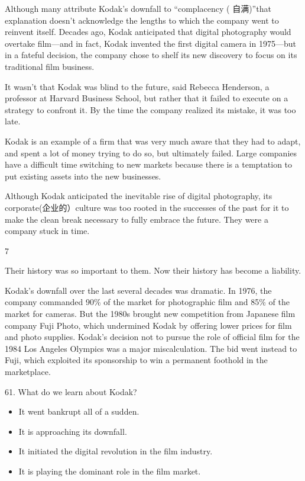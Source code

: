 \documentclass[UTF8,11pt]{ctexart}
\begin{document}
Although many attribute Kodak’s downfall to “complacency ( 自满)”that explanation doesn’t acknowledge the lengths to which the company went to reinvent itself. Decades ago, Kodak anticipated that digital photography would overtake film—and in fact, Kodak invented the first digital camera in 1975—but in a fateful decision, the company chose to shelf its new discovery to focus on its traditional film business.


It wasn’t that Kodak was blind to the future, said Rebecca Henderson, a professor at Harvard Business School, but rather that it failed to execute on a strategy to confront it. By the time the company realized its mistake, it was too late.


Kodak is an example of a firm that was very much aware that they had to adapt, and spent a lot of money trying to do so, but ultimately failed. Large companies have a difficult time switching to new markets because there is a temptation to put existing assets into the new businesses.


Although Kodak anticipated the inevitable rise of digital photography, its corporate(企业的）culture was too rooted in the successes of the past for it to make the clean break necessary to fully embrace the future. They were a company stuck in time.


7


Their history was so important to them. Now their history has become a liability.


Kodak’s downfall over the last several decades was dramatic. In 1976, the company commanded 90\% of the market for photographic film and 85\% of the market for cameras. But the 1980s brought new competition from Japanese film company Fuji Photo, which undermined Kodak by offering lower prices for film and photo supplies. Kodak’s decision not to pursue the role of official film for the 1984 Los Angeles Olympics was a major miscalculation. The bid went instead to Fuji, which exploited its sponsorship to win a permanent foothold in the marketplace.


61. What do we learn about Kodak?


\begin{itemize}[leftmargin=2em,itemsep=.2em,topsep=.4em]\item[A.] It went bankrupt all of a sudden.
\item[B.] It is approaching its downfall.
\item[C.] It initiated the digital revolution in the film industry.
\item[D.] It is playing the dominant role in the film market.
\end{itemize}
\end{document}
